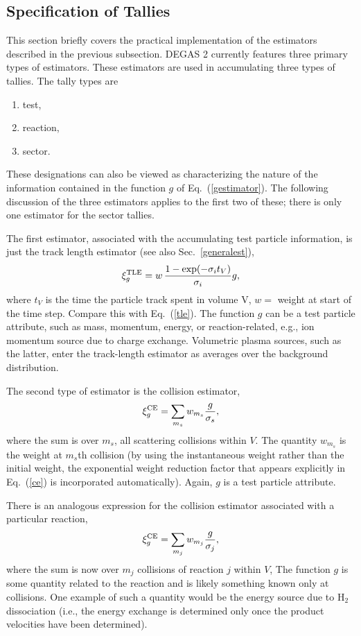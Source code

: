 \documentclass[12pt]{report}
\begin{document}
\subsection{Specification of Tallies}
\label{tallies}

This section briefly covers the practical implementation of the estimators
described in the previous subsection.
DEGAS 2 currently features three primary types of estimators. These estimators
are used in accumulating three types of tallies. The tally types are
\begin{enumerate}
  \item test,
  \item reaction,
  \item sector.
\end{enumerate}
These designations can also be viewed as characterizing the nature of the
information contained in the function $g$ of Eq.~(\ref{gestimator}).
The following discussion of the three estimators applies to the first
two of these; there is only one estimator for the sector tallies.
 
The first estimator, associated with the accumulating
test particle information, is just the track length estimator (see also
Sec.~\ref{generalest}),
\begin{equation}
\xi_{g}^{\rm TLE} = w \, \frac{1 - \exp(-\sigma_{i} t_{V})}{\sigma_{i}} g,
\end{equation}
where  $t_{V}$ is the time the particle track spent in volume V,
$w =$ weight at start of the time step. Compare this with Eq.~(\ref{tle}).
The function $g$ can be a test particle attribute, such as
mass, momentum, energy, or reaction-related, e.g., ion 
momentum source due to charge exchange. 
Volumetric
plasma sources, such as the latter, 
enter the track-length estimator as averages over the background 
distribution\cite{Reit93}.

The second type of estimator is the collision estimator,
\begin{equation}
\xi_{g}^{\rm CE} = \sum_{m_{s}} w_{m_{s}} 
\frac{g}{\sigma_{s}},
\end{equation}
where the sum is over $m_{s}$, all scattering collisions within $V$.
The quantity $w_{m_{s}}$ is the weight at $m_{s}$th collision (by using the
instantaneous weight rather than the initial weight, 
the exponential weight reduction factor that appears explicitly in
Eq.~(\ref{ce}) is incorporated automatically). 
Again, $g$ is a test particle attribute.

There is an analogous expression for the collision estimator associated
with a particular reaction,
\begin{equation}
\xi_{g}^{\rm CE} = \sum_{m_{j}} w_{m_{j}} \frac{g}{\sigma_{j}},
\end{equation}
where the sum is now over $m_{j}$ collisions of reaction $j$ within $V$,
The function $g$ is some quantity related to the reaction and is likely
something known only at collisions. One example of such a quantity would
be the energy source due to H$_{2}$ dissociation (i.e., the energy
exchange is determined only once the product velocities have been 
determined).
\end{document}
